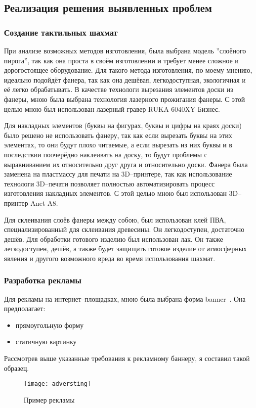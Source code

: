 \subsection{Реализация решения выявленных проблем}
\subsubsection{Создание тактильных шахмат}
При анализе возможных методов изготовления, была выбрана модель ''слоёного
пирога'', так как она проста в своём изготовлении и требует менее сложное и
дорогостоящее оборудование. Для такого метода изготовления, по моему мнению,
идеально подойдёт фанера, так как она дешёвая, легкодоступная, экологичная и её
легко обрабатывать. В качестве технологи вырезания элементов доски из фанеры,
мною была выбрана технология лазерного прожигания фанеры. С этой целью мною был
использован лазерный гравер RUKA 6040XY Бизнес.

Для накладных элементов (буквы на фигурах, буквы и цифры на краях доски) было
решено не использовать фанеру, так как если вырезать буквы на этих элементах,
то они будут плохо читаемые, а если вырезать из них буквы и в последствии
поочерёдно наклеивать на доску, то будут проблемы с выравниванием их
относительно друг друга и относительно доски. Фанера была заменена на
пластмассу для печати на 3D--принтере, так как использование технологи
3D--печати позволяет полностью автоматизировать процесс изготовления накладных
элементов. С этой целью мною был использован 3D--принтер Anet A8.

Для склеивания слоёв фанеры между собою, был использован клей ПВА,
специализированный для склеивания древесины. Он легкодоступен, достаточно
дешёв. Для обработки готового изделию был использован лак. Он также
легкодоступен, дешёв, а также будет защищать готовое изделие от атмосферных
явления и другого возможного вреда во время использования шахмат.

\subsubsection{Разработка рекламы}
Для рекламы на интернет--площадках, мною была выбрана форма
\gls{banner}~\cite{web:wiki-banner}. Она предполагает:
\begin{itemize}
    \item прямоугольную форму
    \item статичную картинку
\end{itemize}

Рассмотрев выше указанные требования к рекламному баннеру, я составил такой образец.

\begin{figure}[H]
    \centering
    \texttt{[image: adversting]}
    \caption{Пример рекламы}\label{fig:adversting}
\end{figure}
\newpage
